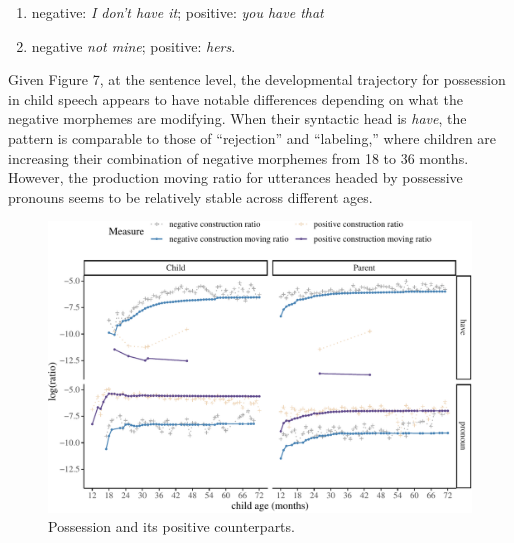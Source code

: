 \documentclass[
  english,
  man,floatsintext]{apa6}
\providecommand{\tightlist}{%
  \setlength{\itemsep}{0pt}\setlength{\parskip}{0pt}}
\begin{document}
\begin{enumerate}
\def\labelenumi{(\arabic{enumi})}
\setcounter{enumi}{14}
\tightlist
\item
  negative: \emph{I don't have it}; positive: \emph{you have that}
\item
  negative \emph{not mine}; positive: \emph{hers}.
\end{enumerate}

Given Figure 7, at the sentence level, the developmental trajectory for possession in child speech appears to have notable differences depending on what the negative morphemes are modifying. When their syntactic head is \emph{have}, the pattern is comparable to those of ``rejection'' and ``labeling,'' where children are increasing their combination of negative morphemes from 18 to 36 months. However, the production moving ratio for utterances headed by possessive pronouns seems to be relatively stable across different ages.

\begin{figure}[H]

{\centering \includegraphics{neg_construction_article_files/figure-latex/possession-1} 

}

\caption{Possession and its positive counterparts.}\label{fig:possession}
\end{figure}
\end{document}
